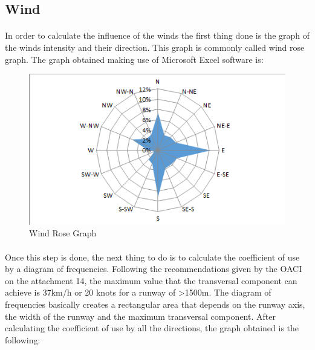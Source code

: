 		\subsection{Wind}
		\paragraph{}In order to calculate the influence of the winds the first thing done is the graph of the winds intensity and their direction. This graph is commonly called wind rose graph. The graph obtained making use of Microsoft Excel software is:
		
		\begin{figure}[H]
			\centering
			\includegraphics[clip, trim=0cm 0cm 0cm 0cm, width=1\textwidth]{./images/WIND/ROSE}
			\caption{Wind Rose Graph} %
			\label{} %
		\end{figure}
		
		\paragraph{}Once this step is done, the next thing to do is to calculate the coefficient of use by a diagram of
		frequencies. Following the recommendations given by the OACI on the attachment 14, the
		maximum value that the transversal component can achieve is 37km/h or 20 knots for a
		runway of >1500m.
		The diagram of frequencies basically creates a rectangular area that depends on the runway
		axis, the width of the runway and the maximum transversal component.
		After calculating the coefficient of use by all the directions, the graph obtained is the following:

